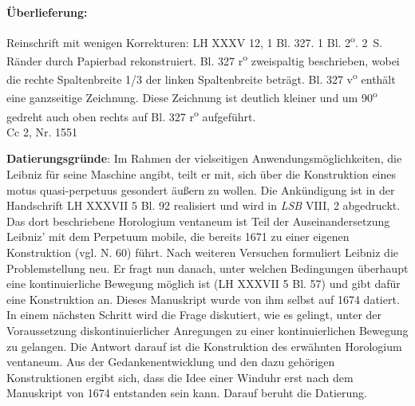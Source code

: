       
               
                \begin{ledgroupsized}[r]{120mm}
                \footnotesize 
                \pstart                
                \noindent\textbf{\"{U}berlieferung:}   
                \pend
                \end{ledgroupsized}
            
              
                            \begin{ledgroupsized}[r]{114mm}
                            \footnotesize 
                            \pstart \parindent -6mm
                            Reinschrift mit wenigen Korrekturen: LH XXXV 12, 1 Bl. 327. 1 Bl. 2\textsuperscript{o}. 2~S. R\"{a}nder durch Papierbad rekonstruiert. Bl. 327 r\textsuperscript{o} zweispaltig beschrieben, wobei die rechte Spaltenbreite 1/3 der linken Spaltenbreite betr\"{a}gt. Bl. 327 v\textsuperscript{o} enth\"{a}lt eine ganzseitige Zeichnung. Diese Zeichnung ist deutlich kleiner und um 90\textsuperscript{o} gedreht auch oben rechts auf Bl. 327 r\textsuperscript{o} aufgef\"{u}hrt.\\Cc 2, Nr. 1551 \pend
                            \end{ledgroupsized}
                \vspace*{5mm}
                \begin{ledgroup}
                \footnotesize 
                \pstart
            \noindent\footnotesize{\textbf{Datierungsgr\"{u}nde}: Im Rahmen der vielseitigen Anwendungsm\"{o}glichkeiten, die Leibniz f\"{u}r seine Maschine angibt, teilt er mit, sich \"{u}ber die Konstruktion eines motus quasi-perpetuus gesondert \"{a}ußern zu wollen. Die Ank\"{u}ndigung ist in der Handschrift LH XXXVII 5 Bl. 92 realisiert und wird in \textit{LSB} VIII, 2 abgedruckt. Das dort beschriebene Horologium ventaneum ist Teil der Auseinandersetzung Leibniz' mit dem Perpetuum mobile, die bereits 1671 zu einer eigenen Konstruktion (vgl. N. 60) f\"{u}hrt. Nach weiteren Versuchen formuliert Leibniz die Problem\-stellung neu. Er fragt nun danach, unter welchen Bedingungen \"{u}berhaupt eine konti\-nuierliche Bewegung m\"{o}glich ist (LH XXXVII 5 Bl. 57) und gibt daf\"{u}r eine Konstruktion an. Dieses Manuskript wurde von ihm selbst auf 1674 datiert. In einem n\"{a}chsten Schritt wird die Frage diskutiert, wie es gelingt, unter der Voraussetzung diskontinuierlicher Anregungen zu einer kontinuierlichen Bewegung zu gelangen. Die Antwort darauf ist die Konstruktion des erw\"{a}hnten Horologium ventaneum. Aus der Gedankenentwicklung und den dazu geh\"{o}rigen Konstruktionen ergibt sich, dass die Idee einer Winduhr erst nach dem Manuskript von 1674 entstanden sein kann. Darauf beruht die Datierung.}
                \pend
                \end{ledgroup}
            
